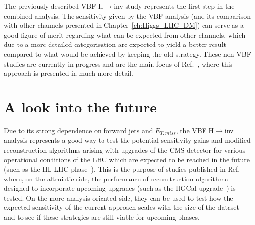 \hspace{10pt} The previously described VBF H$\rightarrow$inv study represents the first step in the combined analysis. The sensitivity given by the VBF analysis (and its comparison with other channels presented in Chapter~\ref{ch:Higgs_LHC_DM}) can serve as a good figure of merit regarding what can be expected from other channels, which due to a more detailed categorisation are expected to yield a better result compared to what would be achieved by keeping the old strategy. These non-VBF studies are currently in progress and are the main focus of Ref.~\cite{thesis:esh}, where this approach is presented in much more detail.






\section{A look into the future}
\hspace{10pt} Due to its strong dependence on forward jets and $E_{T,miss}$, the VBF H$\rightarrow$inv analysis represents a good way to test the potential sensitivity gains and modified reconstruction algorithms arising with upgrades of the CMS detector for various operational conditions of the LHC which are expected to be reached in the future (such as the HL-LHC phase~\cite{paper:hl-lhc}). This is the purpose of studies published in Ref.~\cite{yellow_report} where, on the altruistic side, the performance of reconstruction algorithms designed to incorporate upcoming upgrades (such as the HGCal upgrade~\cite{paper:hgcal}) is tested. On the more analysis oriented side, they can be used to test how the expected sensitivity of the current approach scales with the size of the dataset and to see if these strategies are still viable for upcoming phases.

